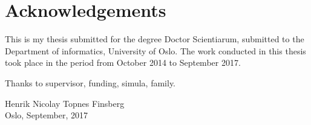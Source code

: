 \chapter*{Acknowledgements}
This is my thesis submitted for the degree Doctor Scientiarum,
submitted to the Department of informatics, University of Oslo. The
work conducted in this thesis took place in the period from October
2014 to September 2017.

Thanks to supervisor, funding, simula, family.

\vspace{5cm}
\noindent
Henrik Nicolay Topnes Finsberg\\
Oslo, September, 2017
      
